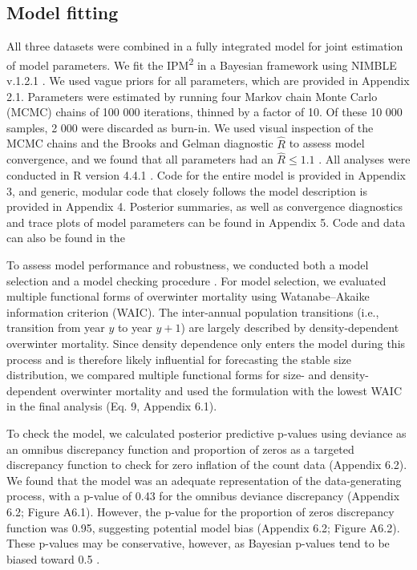 \documentclass{article}
\begin{document}
\subsection{Model fitting}
All three datasets were combined in a fully integrated model for joint estimation of model parameters. We fit the IPM\textsuperscript{2} in a Bayesian framework using NIMBLE v.1.2.1 \parencite{de2017programming}. We used vague priors for all parameters, which are provided in Appendix 2.1. Parameters were estimated by running four Markov chain Monte Carlo (MCMC) chains of 100 000 iterations, thinned by a factor of 10. Of these 10 000 samples, 2 000 were discarded as burn-in. We used visual inspection of the MCMC chains and the Brooks and Gelman diagnostic $\hat{R}$ to assess model convergence, and we found that all parameters had an $\hat{R} \leq 1.1$ \parencite{brooks1998general}. All analyses were conducted in R version 4.4.1 \parencite{Rcore}. Code for the entire model is provided in Appendix 3, and generic, modular code that closely follows the model description is provided in Appendix 4. Posterior summaries, as well as convergence diagnostics and trace plots of model parameters can be found in Appendix 5. Code and data can also be found in the

To assess model performance and robustness, we conducted both a model selection and a model checking procedure \parencite{conn2018guide}. For model selection, we evaluated multiple functional forms of overwinter mortality using Watanabe–Akaike information criterion (WAIC). The inter-annual population transitions (i.e., transition from year $y$ to year $y + 1$) are largely described by density-dependent overwinter mortality. Since density dependence only enters the model during this process and is therefore likely influential for forecasting the stable size distribution, we compared multiple functional forms for size- and density-dependent overwinter mortality and used the formulation with the lowest WAIC in the final analysis (Eq. 9, Appendix 6.1).

To check the model, we calculated posterior predictive p-values using deviance as an omnibus discrepancy function and proportion of zeros as a targeted discrepancy function to check for zero inflation of the count data (Appendix 6.2). We found that the model was an adequate representation of the data-generating process, with a p-value of 0.43 for the omnibus deviance discrepancy (Appendix 6.2; Figure A6.1). However, the p-value for the proportion of zeros discrepancy function was 0.95, suggesting potential model bias (Appendix 6.2; Figure A6.2). These p-values may be conservative, however, as Bayesian p-values tend to be biased toward 0.5 \parencite{conn2018guide}.
\end{document}
